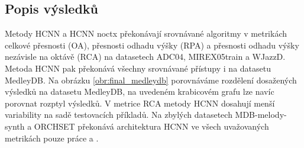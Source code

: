 \begin{table}[h]
\centering
{}%
\caption{Výsledky nesprávné detekce (Voicing False Alarm). Nižší hodnota je lepší.}\label{tab:vysledky_VFA}
\end{table}


\subsection{Popis výsledků}

Metody HCNN a HCNN noctx překonávají srovnávané algoritmy v metrikách celkové přesnosti (OA), přesnosti odhadu výšky (RPA) a přesnosti odhadu výšky nezávisle na oktávě (RCA) na datasetech ADC04, MIREX05train a WJazzD. Metoda HCNN pak překonává všechny srovnávané přístupy i na datasetu MedleyDB. Na obrázku \ref{obr:final_medleydb} porovnáváme rozdělení dosažených výsledků na datasetu MedleyDB, na uvedeném krabicovém grafu lze navíc porovnat rozptyl výsledků. V metrice RCA metody HCNN dosahují menší variability na sadě testovacích příkladů. Na zbylých datasetech MDB-melody-synth a ORCHSET překonává architektura HCNN ve všech uvažovaných metrikách pouze práce \cite{Salamon2012a} a \cite{Bittner2017}.

